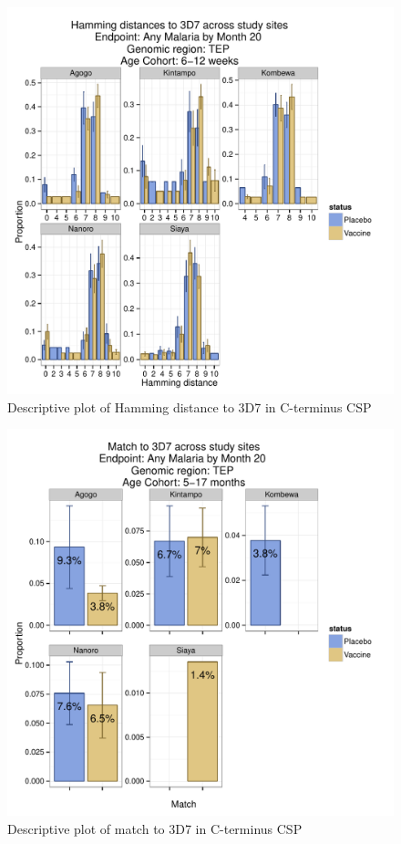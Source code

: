 \documentclass[]{article}
\begin{document}
\begin{figure}[htbp]
\centering
\includegraphics{figures/hamming-newborn-sites-x-1.pdf}
\caption{Descriptive plot of Hamming distance to 3D7 in C-terminus CSP}
\end{figure}

\begin{figure}[htbp]
\centering
\includegraphics{figures/match-infant-sites-x-1.pdf}
\caption{Descriptive plot of match to 3D7 in C-terminus CSP}
\end{figure}
\end{document}
